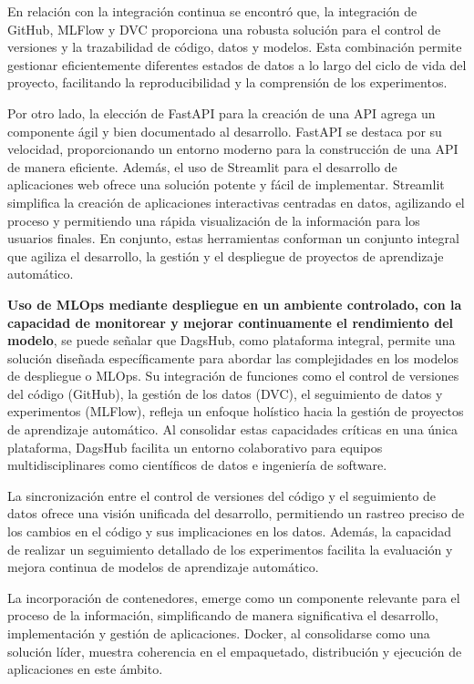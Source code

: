 En relación con la integración continua se encontró que, la integración de GitHub, MLFlow y DVC  proporciona una robusta solución para el control de versiones y la trazabilidad de código, datos y modelos. Esta combinación permite gestionar eficientemente diferentes estados de datos a lo largo del ciclo de vida del proyecto, facilitando la reproducibilidad y la comprensión de los experimentos.

Por otro lado, la elección de FastAPI para la creación de una API agrega un componente ágil y bien documentado al desarrollo. FastAPI se destaca por su velocidad, proporcionando un entorno moderno para la construcción de una API de manera eficiente. Además, el uso de Streamlit para el desarrollo de aplicaciones web ofrece una solución potente y fácil de implementar. Streamlit simplifica la creación de aplicaciones interactivas centradas en datos, agilizando el proceso y permitiendo una rápida visualización de la información para los usuarios finales. En conjunto, estas herramientas conforman un conjunto integral que agiliza el desarrollo, la gestión y el despliegue de proyectos de aprendizaje automático. \newline

\textbf{Uso de MLOps mediante despliegue en un ambiente controlado, con la capacidad de monitorear y mejorar continuamente el rendimiento del modelo}, se puede señalar que DagsHub, como plataforma integral, permite una solución diseñada específicamente para abordar las complejidades en los modelos de despliegue o MLOps. Su integración de funciones como el control de versiones del código (GitHub), la gestión de los datos (DVC), el seguimiento de datos y experimentos (MLFlow), refleja un enfoque holístico hacia la gestión de proyectos de aprendizaje automático. Al consolidar estas capacidades críticas en una única plataforma, DagsHub facilita un entorno colaborativo para equipos multidisciplinares como científicos de datos e ingeniería de software.

\newpage

La sincronización entre el control de versiones del código y el seguimiento de datos ofrece una visión unificada del desarrollo, permitiendo un rastreo preciso de los cambios en el código y sus implicaciones en los datos. Además, la capacidad de realizar un seguimiento detallado de los experimentos facilita la evaluación y mejora continua de modelos de aprendizaje automático.

La incorporación de contenedores, emerge como un componente relevante para el proceso de la información, simplificando de manera significativa el desarrollo, implementación y gestión de aplicaciones. Docker, al consolidarse como una solución líder, muestra coherencia en el empaquetado, distribución y ejecución de aplicaciones en este ámbito.

